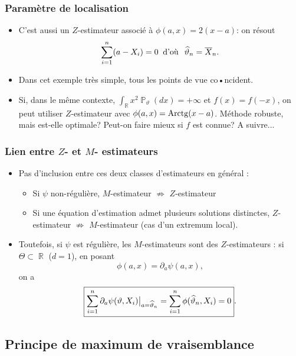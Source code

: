 ﻿\documentclass{beamer}
\DeclareMathOperator{\R}{{\mathbb R}}
\DeclareMathOperator{\PP}{{\mathbb P}}
\DeclareMathOperator{\est}{\widehat \vartheta_{\mathnormal{n}}}
\begin{document}
\begin{frame}
\frametitle{Paramètre de localisation}
\begin{itemize}
\item C'est {\color{red}aussi} un $Z$-estimateur associé à $\phi(a,x)=2(x-a)$: on résout
$$\sum_{i = 1}^n (a-X_i)=0\;\;\text{d'où}\;\;\est = \overline{X}_n.$$
\item Dans cet {\color{red}exemple très simple},
tous les points de vue co•ncident.
%
\item Si, dans le même contexte,
$\int_{\R}x^2\PP_\vartheta(dx)=+\infty$ et $f(x)=f(-x)$, on peut
utiliser $Z$-estimateur avec $\phi(a,x)={\rm Arctg}(x-a)$. M\'ethode
robuste, mais est-elle optimale? Peut-on faire mieux {\color{red}si
$f$ est connue? A suivre...}
\end{itemize}
\end{frame}

\begin{frame}
\frametitle{Lien entre $Z$- et $M$- estimateurs}
\begin{itemize}
\item {\color{red}Pas d'inclusion} entre ces deux classes d'estimateurs {\color{red}en général} :
\begin{itemize}
\item Si $\psi$ non-régulière, $M$-estimateur $\nRightarrow$ $Z$-estimateur
\item Si une équation d'estimation admet plusieurs solutions distinctes, $Z$-estimateur $\nRightarrow$ $M$-estimateur (cas d'un extremum local).
\end{itemize}
\item Toutefois, si $\psi$ {\color{red}est régulière}, les $M$-estimateurs {\color{red}sont} des $Z$-estimateurs : si $\Theta \subset \R$ ($d=1$), en posant
$$\phi(a,x) = \partial_a\psi(a,x),$$
on a
$$\boxed{\sum_{i = 1}^n \partial_{a} \psi(\vartheta, X_i)\big|_{a = \est}
= \sum_{i = 1}^n \phi(\est, X_i)=0}.$$
\end{itemize}
\end{frame}


\subsection{Principe de maximum de vraisemblance}
\end{document}
